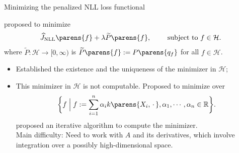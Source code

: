 \documentclass[aspectratio=169,xcolor=dvipsnames]{beamer}
\newcommand{\NLL}{\mathrm{NLL}}
\newcommand{\calH}{\mathcal{H}}
\begin{document}
\begin{frame}{Minimizing the penalized NLL loss functional}
	
	
	\textcite{Gu1993-na} proposed to minimize 
	\begin{align}
		\widehat{J}_{\NLL} \parens{f} + \lambda \widetilde{P} \parens{f}, \qquad \text{ subject to } f \in \mathcal{H}. 
	\end{align}
	where $\widetilde{P}: \mathcal{H} \to [0, \infty)$ is $\widetilde{P} \parens{f} := P \parens{q_f}$ for all $f \in \mathcal{H}$. 
	
	\vspace{5pt}
	
	\begin{itemize}
		\item Established the existence and the uniqueness of the minimizer in $\mathcal{H}$; 
		\item This minimizer in $\mathcal{H}$ is {\color{red} not} computable. Proposed to minimize over 
		\begin{align*}
			\bigg\{f \Bigm| f := \sum_{i=1}^n \alpha_i k \parens{X_i, \,\cdot\,}, \alpha_1, \cdots, \alpha_n \in \mathbb{R} \bigg\}. 
		\end{align*}
		\textcite{Gu1993-lf} proposed an iterative algorithm to compute the minimizer. \\ 
		
		{\color{red} Main difficulty:} Need to work with {\color{red}$A$ and its derivatives}, which involve integration over a possibly high-dimensional space. 
		
%		
		

\end{itemize}
\end{frame}
\end{document}
